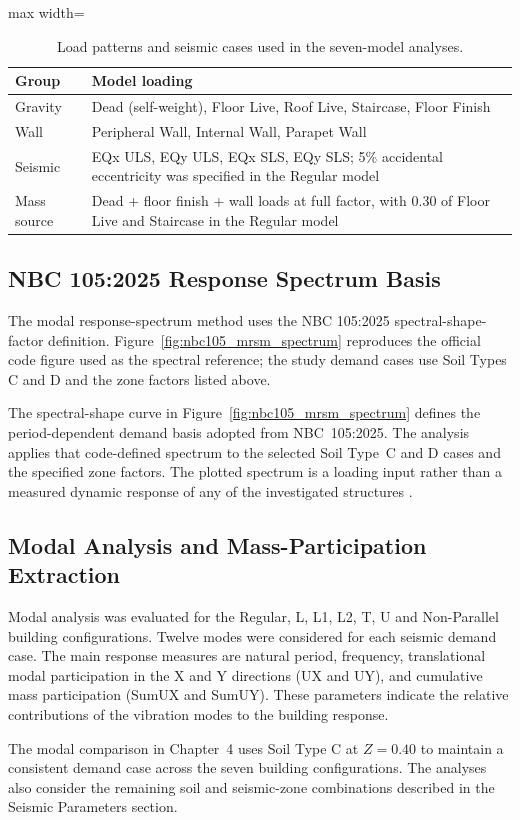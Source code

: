 \begin{table}[H]
\centering
\caption{Load patterns and seismic cases used in the seven-model analyses.}
\label{tab:load_patterns}
\small
\begin{adjustbox}{max width=\linewidth}
\begin{tabular}{@{}lp{8.5cm}@{}}
\toprule
Group & Model loading \\
\midrule
Gravity & Dead (self-weight), Floor Live, Roof Live, Staircase, Floor Finish \\
Wall & Peripheral Wall, Internal Wall, Parapet Wall \\
Seismic & EQx ULS, EQy ULS, EQx SLS, EQy SLS; 5\% accidental eccentricity was specified in the Regular model \\
Mass source & Dead + floor finish + wall loads at full factor, with 0.30 of Floor Live and Staircase in the Regular model \\
\bottomrule
\end{tabular}
\end{adjustbox}
\end{table}

\subsection{NBC 105:2025 Response Spectrum Basis}


The modal response-spectrum method uses the NBC 105:2025 spectral-shape-factor definition. Figure~\ref{fig:nbc105_mrsm_spectrum} reproduces the official code figure used as the spectral reference; the study demand cases use Soil Types C and D and the zone factors listed above.


The spectral-shape curve in Figure~\ref{fig:nbc105_mrsm_spectrum} defines the period-dependent demand basis adopted from NBC~105:2025. The analysis applies that code-defined spectrum to the selected Soil Type~C and D cases and the specified zone factors. The plotted spectrum is a loading input rather than a measured dynamic response of any of the investigated structures \cite{nbc105_2025}.

\FloatBarrier

\subsection{Modal Analysis and Mass-Participation Extraction}
Modal analysis was evaluated for the Regular, L, L1, L2, T, U and Non-Parallel building configurations. Twelve modes were considered for each seismic demand case. The main response measures are natural period, frequency, translational modal participation in the X and Y directions (UX and UY), and cumulative mass participation (SumUX and SumUY). These parameters indicate the relative contributions of the vibration modes to the building response.

The modal comparison in Chapter~4 uses Soil Type C at $Z=0.40$ to maintain a consistent demand case across the seven building configurations. The analyses also consider the remaining soil and seismic-zone combinations described in the Seismic Parameters section.


\FloatBarrier
